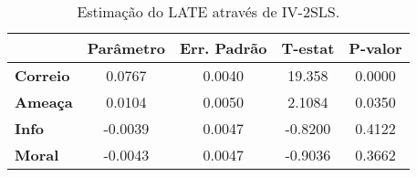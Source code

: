 \begin{table}[ht]
\centering
\caption{\label{tab:iv2sls} Estimação do LATE através de IV-2SLS.}
\begin{tabular}{lcccc}
\toprule\toprule
                 & \textbf{Parâmetro} & \textbf{Err. Padrão} & \textbf{T-estat} & \textbf{P-valor} \\
\midrule
\textbf{Correio} &       0.0767       &       0.0040       &      19.358     &      0.0000  \\
\textbf{Ameaça}  &       0.0104       &       0.0050       &      2.1084     &      0.0350  \\
\textbf{Info}    &      -0.0039       &       0.0047       &     -0.8200     &      0.4122  \\
\textbf{Moral}  &      -0.0043       &       0.0047       &     -0.9036     &      0.3662   \\
\bottomrule\bottomrule
\end{tabular}


\end{table}

